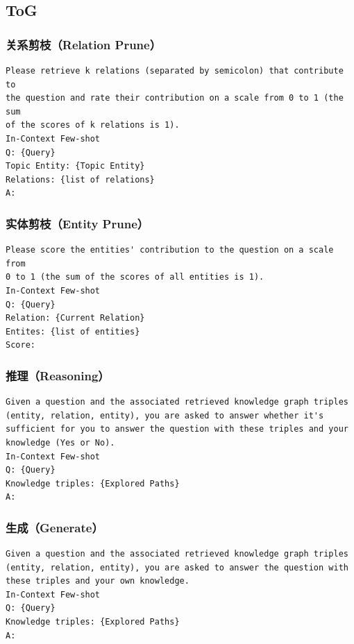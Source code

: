 \documentclass[11pt,UTF8,fontset=fandol]{ctexart}
\begin{document}
\subsection{ToG}

\subsubsection{关系剪枝（Relation Prune）}
\begin{verbatim}
Please retrieve k relations (separated by semicolon) that contribute to
the question and rate their contribution on a scale from 0 to 1 (the sum
of the scores of k relations is 1).
In-Context Few-shot
Q: {Query}
Topic Entity: {Topic Entity}
Relations: {list of relations}
A:
\end{verbatim}

\subsubsection{实体剪枝（Entity Prune）}
\begin{verbatim}
Please score the entities' contribution to the question on a scale from
0 to 1 (the sum of the scores of all entities is 1).
In-Context Few-shot
Q: {Query}
Relation: {Current Relation}
Entites: {list of entities}
Score:
\end{verbatim}

\subsubsection{推理（Reasoning）}
\begin{verbatim}
Given a question and the associated retrieved knowledge graph triples
(entity, relation, entity), you are asked to answer whether it's
sufficient for you to answer the question with these triples and your
knowledge (Yes or No).
In-Context Few-shot
Q: {Query}
Knowledge triples: {Explored Paths}
A:
\end{verbatim}

\subsubsection{生成（Generate）}
\begin{verbatim}
Given a question and the associated retrieved knowledge graph triples
(entity, relation, entity), you are asked to answer the question with
these triples and your own knowledge.
In-Context Few-shot
Q: {Query}
Knowledge triples: {Explored Paths}
A:
\end{verbatim}
\end{document}

